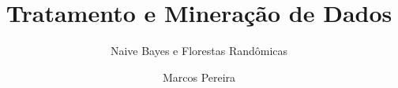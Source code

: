 \documentclass[compress]{beamer}
\title{Tratamento e Mineração de Dados}
\subtitle{Naive Bayes e Florestas Randômicas}
\author{Marcos Pereira}
\begin{document}
\frame{\titlepage}

\frame{\tableofcontents}
\section{}
\end{document}
